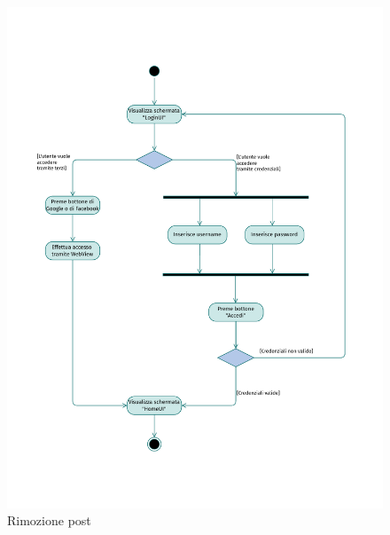 \documentclass{natourDoc}
\begin{document}
\newpage
\begin{figure}[!htbp]
	\centering
	\includegraphics[width=\textwidth, page=4]{./diagrams/activity.pdf}
	\caption{Rimozione post}
\end{figure}
\FloatBarrier
\end{document}
